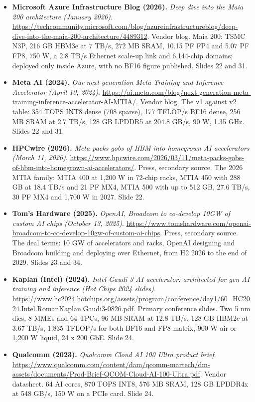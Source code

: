 \begin{itemize}[leftmargin=1.2em,itemsep=3pt]
\item \textbf{Microsoft Azure Infrastructure Blog (2026).} \textit{Deep dive into the Maia 200 architecture (January 2026)}. \url{https://techcommunity.microsoft.com/blog/azureinfrastructureblog/deep-dive-into-the-maia-200-architecture/4489312}. Vendor blog. Maia 200: TSMC N3P, 216 GB HBM3e at 7 TB/s, 272 MB SRAM, 10.15 PF FP4 and 5.07 PF FP8, 750 W, a 2.8 TB/s Ethernet scale-up link and 6,144-chip domains; deployed only inside Azure, with no BF16 figure published. Slides 22 and 31.
\item \textbf{Meta AI (2024).} \textit{Our next-generation Meta Training and Inference Accelerator (April 10, 2024)}. \url{https://ai.meta.com/blog/next-generation-meta-training-inference-accelerator-AI-MTIA/}. Vendor blog. The v1 against v2 table: 354 TOPS INT8 dense (708 sparse), 177 TFLOP/s BF16 dense, 256 MB SRAM at 2.7 TB/s, 128 GB LPDDR5 at 204.8 GB/s, 90 W, 1.35 GHz. Slides 22 and 31.
\item \textbf{HPCwire (2026).} \textit{Meta packs gobs of HBM into homegrown AI accelerators (March 11, 2026)}. \url{https://www.hpcwire.com/2026/03/11/meta-packs-gobs-of-hbm-into-homegrown-ai-accelerators/}. Press, secondary source. The 2026 MTIA family: MTIA 400 at 1,200 W in 72-chip racks, MTIA 450 with 288 GB at 18.4 TB/s and 21 PF MX4, MTIA 500 with up to 512 GB, 27.6 TB/s, 30 PF MX4 and 1,700 W in 2027. Slide 22.
\item \textbf{Tom's Hardware (2025).} \textit{OpenAI, Broadcom to co-develop 10GW of custom AI chips (October 13, 2025)}. \url{https://www.tomshardware.com/openai-broadcom-to-co-develop-10gw-of-custom-ai-chips}. Press, secondary source. The deal terms: 10 GW of accelerators and racks, OpenAI designing and Broadcom building and deploying over Ethernet, from H2 2026 to the end of 2029. Slides 23 and 34.
\item \textbf{Kaplan (Intel) (2024).} \textit{Intel Gaudi 3 AI accelerator: architected for gen AI training and inference (Hot Chips 2024 slides)}. \url{https://www.hc2024.hotchips.org/assets/program/conference/day1/60_HC2024.Intel.RomanKaplan.Gaudi3-0826.pdf}. Primary conference slides. Two 5 nm dies, 8 MMEs and 64 TPCs, 96 MB SRAM at 12.8 TB/s, 128 GB HBM2e at 3.67 TB/s, 1,835 TFLOP/s for both BF16 and FP8 matrix, 900 W air or 1,200 W liquid, 24 x 200 GbE. Slide 24.
\item \textbf{Qualcomm (2023).} \textit{Qualcomm Cloud AI 100 Ultra product brief}. \url{https://www.qualcomm.com/content/dam/qcomm-martech/dm-assets/documents/Prod-Brief-QCOM-Cloud-AI-100-Ultra.pdf}. Vendor datasheet. 64 AI cores, 870 TOPS INT8, 576 MB SRAM, 128 GB LPDDR4x at 548 GB/s, 150 W on a PCIe card. Slide 24.

\end{itemize}
